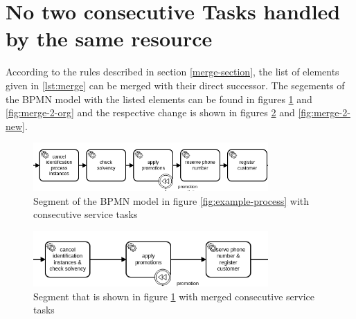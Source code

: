 \section{No two consecutive Tasks handled by the same resource}
According to the rules described in section \ref{merge-section}, the list of elements given in \ref{lst:merge} can be merged with their direct successor. The segements of the BPMN model with the listed elements can be found in figures \ref{fig:merge-1-org} and \ref{fig:merge-2-org} and the respective change is shown in figures \ref{fig:merge-1-new} and \ref{fig:merge-2-new}. 
\begin{figure}[H]
	\centering
	\includegraphics[width=0.8\textwidth]{graphics/case-study-merge-org-1}
	\caption{Segment of the BPMN model in figure \ref{fig:example-process} with consecutive service tasks}
	\label{fig:merge-1-org}
\end{figure}

\begin{figure}[H]
	\centering
	\includegraphics[width=0.8\textwidth]{graphics/case-study-merge-new-1}
	\caption{Segment that is shown in figure \ref{fig:merge-1-org} with merged consecutive service tasks}
	\label{fig:merge-1-new}
\end{figure}

